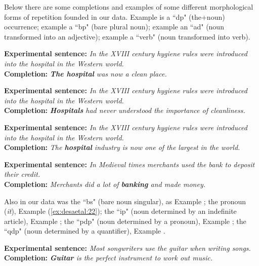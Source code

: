 \documentclass[output=paper,
modfonts
]{langscibook}
\begin{document}
Below there are some completions and examples of some different morphological forms of repetition founded in our data. Example  is a “dp" (the+noun) occurrence; example  a “bp" (bare plural noun); example  an “ad" (noun transformed into an adjective); example  a “verb" (noun transformed into verb).

\ea \label{ex:desaetal:17}
\textbf{Experimental sentence:} \textit{In the XVIII century hygiene rules were introduced into the	hospital in the Western world.}
\\ \textbf{Completion:} \textit{\textbf{The hospital} was now a clean place.} 
\z

\ea\label{ex:desaetal:18}
\textbf{Experimental sentence:} \textit{In the XVIII century hygiene rules were introduced into the hospital in the Western world.}
\\ \textbf{Completion:} \textit{\textbf{Hospitals} had never understood the importance of cleanliness.} 
\z

\ea \label{ex:desaetal:19}
\textbf{Experimental sentence:} \textit{In the XVIII century hygiene rules were introduced into the hospital in the Western world.}
\\ \textbf{Completion:} \textit{The \textbf{hospital} industry is now one of the largest in the world.} 
\z

\ea \label{ex:desaetal:20}
\textbf{Experimental sentence:} \textit{In Medieval times merchants used the bank to deposit their credit.}\largerpage
\\ \textbf{Completion:} \textit{Merchants did a lot of  \textbf{banking} and made money.} 
\z

Also in our data was the “bs" (bare noun singular), as Example ; the pronoun (\textit{it}), Example (\ref{ex:desaetal:22}); the “ip" (noun determined by an indefinite article), Example ; the “pdp" (noun determined by a pronoun), Example ; the “qdp" (noun determined by a quantifier), Example .


\ea \label{ex:desaetal:21}
\textbf{Experimental sentence:} \textit{Most songwriters use the guitar when writing songs.}
\\ \textbf{Completion:} \textit{\textbf{Guitar} is the perfect instrument to work out music.} 
\z
\end{document}

